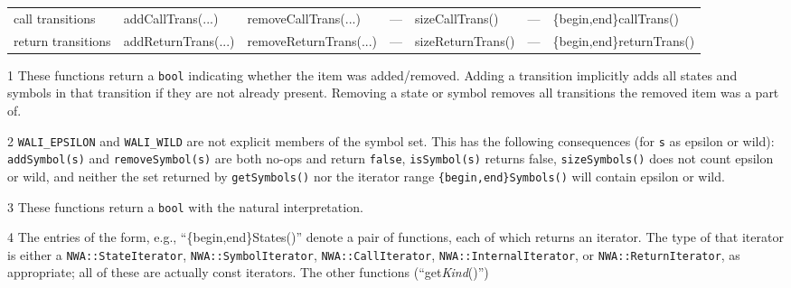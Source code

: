 \begin{sidewaystable}
\begin{threeparttable}
\begin{tabular}{p{0.75in}p{1.55in}p{1.6in}p{1.35in}p{1.27in}p{1.2in}p{1.5in}}
call \newline
transitions      &  addCallTrans(\phantom{.}...\tnote{6}\phantom{a})
                                                            &  removeCallTrans(\phantom{.}...\tnote{6}\phantom{a})
                                                                                                        &  ---                       &  sizeCallTrans()      &  ---                       &  \{begin,end\}callTrans()      \\
return \newline
transitions      &  addReturnTrans(\phantom{.}...\tnote{6}\phantom{a})
                                                            &  removeReturnTrans(\phantom{.}...\tnote{6}\phantom{a})
                                                                                                        &  ---                       &  sizeReturnTrans()  &  ---                       &  \{begin,end\}returnTrans()\\
\hline
\end{tabular}
\begin{tablenotes}
  \item[1] These functions return a \texttt{bool} indicating whether the item
    was added/removed. Adding a transition implicitly adds all
    states and symbols in that transition if they are not already present.
    Removing a state or symbol removes all transitions the removed item was a
    part of.
  \item[2] \texttt{WALI\_EPSILON} and \texttt{WALI\_WILD} are not explicit
    members of the symbol set. This has the following consequences (for
    \texttt{s} as epsilon or wild): \texttt{addSymbol(s)} and
    \texttt{removeSymbol(s)} are both no-ops and return \texttt{false},
    \texttt{isSymbol(s)} returns false, \texttt{sizeSymbols()} does not count
    epsilon or wild, and neither the set returned by \texttt{getSymbols()}
    nor the iterator range \texttt{\{begin,end\}Symbols()} will contain
    epsilon or wild.
  \item[3] These functions return a \texttt{bool} with the natural
    interpretation.
  \item[4] The entries of the form, e.g., ``\{begin,end\}States()'' denote a pair
    of functions, each of which returns an iterator. The type of that iterator
    is either a \texttt{NWA::StateIterator},
    \texttt{NWA::SymbolIterator}, \texttt{NWA::CallIterator},
    \texttt{NWA::InternalIterator}, or \texttt{NWA::ReturnIterator}, as appropriate; all of these are
    actually const iterators. The other functions (``get\textit{Kind}()'')

\end{tablenotes}
\end{threeparttable}
\end{sidewaystable}
